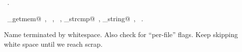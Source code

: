 \documentclass[a4paper]{report}
\begin{document}
\begin{flushleft}
\begin{minipage}{\linewidth}
\vspace{-1.5ex}
\footnotesize
\begin{list}{}{\setlength{\itemsep}{-\parsep}\setlength{\itemindent}{-\leftmargin}}
\item \NWtxtMacroRefIn\ .
\item \NWtxtIdentsUsed\nobreak\  \verb@arena_getmem@\nobreak\ , \verb@FALSE@\nobreak\ , \verb@Name@\nobreak\ , \verb@robs_strcmp@\nobreak\ , \verb@save_string@\nobreak\ , \verb@TRUE@\nobreak\ .
\item{}
\end{list}
\end{minipage}\vspace{4ex}
\end{flushleft}
Name terminated by whitespace.  Also check for ``per-file'' flags. Keep
skipping white space until we reach scrap.
\end{document}

